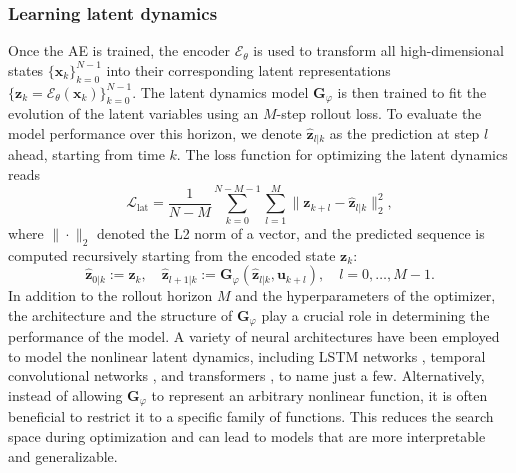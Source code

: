 \documentclass{article}
\begin{document}
\subsubsection{Learning latent dynamics}
Once the AE is trained, the encoder $\mathcal{E}_{\theta}$ is used to transform all high-dimensional states $\{\mathbf{x}_k\}_{k=0}^{N-1}$ into their corresponding latent representations $\{\mathbf{z}_k=\mathcal{E}_{\theta}(\mathbf{x}_k)\}_{k=0}^{N-1}$.
The latent dynamics model $\mathbf{G}_\varphi$ is then trained to fit the evolution of the latent variables using an $M$-step rollout loss.
To evaluate the model performance over this horizon, we denote $\hat{\mathbf{z}}_{l|k}$ as the prediction at step $l$ ahead, starting from time $k$.
The loss function for optimizing the latent dynamics reads
\begin{equation}
\label{eq:opt-lat-dyn-alone}
\mathcal{L}_{\text{lat}} = \frac{1}{N-M} \sum_{k=0}^{N-M-1} \sum_{l=1}^M \| \mathbf{z}_{k+l} - \hat{\mathbf{z}}_{l|k} \|_2^2,
\end{equation}
where $\| \cdot \|_2$ denoted the L2 norm of a vector, and the predicted sequence is computed recursively starting from the encoded state $\mathbf{z}_k$:
\begin{equation*}
\hat{\mathbf{z}}_{0|k} := \mathbf{z}_k, \quad \hat{\mathbf{z}}_{l+1|k} := \mathbf{G}_\varphi(\hat{\mathbf{z}}_{l|k}, \mathbf{u}_{k+l}), \quad l=0, \dots, M-1.
\end{equation*}
In addition to the rollout horizon $M$ and the hyperparameters of the optimizer, the architecture and the structure of $\mathbf{G}_\varphi$ play a crucial role in determining the performance of the model.
A variety of neural architectures have been employed to model the nonlinear latent dynamics, including LSTM networks \citep{mjalled2023reduced}, temporal convolutional networks \citep{xia2023hierarchical}, and transformers \citep{hemmasian2023reduced}, to name just a few.
Alternatively, instead of allowing $\mathbf{G}_\varphi$ to represent an arbitrary nonlinear function, it is often beneficial to restrict it to a specific family of functions.
This reduces the search space during optimization and can lead to models that are more interpretable and generalizable.
\end{document}
